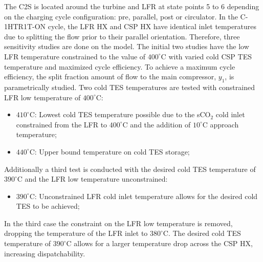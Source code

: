 \begin{paracol}{2}
\linenumbers
\switchcolumn

The C2S is located around the turbine and LFR at state points 5 to 6 depending on the charging cycle configuration: pre, parallel, post or circulator. In the C-1HTR1T-ON cycle, the LFR HX and CSP HX have identical inlet temperatures due to splitting the flow prior to their parallel orientation. Therefore, three sensitivity studies are done on the model. The initial two studies have the low LFR temperature constrained to the value of $400^{\circ}$C with varied cold CSP TES temperature and maximized cycle efficiency. To achieve a maximum cycle efficiency, the split fraction amount of flow to the main compressor, $y_{1}$, is parametrically studied.
Two cold TES temperatures are tested with constrained LFR low temperature of $400^{\circ}$C: 
\begin{itemize}
    \item	$410^{\circ}$C: Lowest cold TES temperature possible due to the sCO$_2$ cold inlet constrained from the LFR to $400^{\circ}$C and the addition of $10^{\circ}$C approach temperature;
    \item	$440^{\circ}$C: Upper bound temperature on cold TES storage;
\end{itemize}

Additionally a third test is conducted with the desired cold TES temperature of $390^{\circ}$C and the LFR low temperature unconstrained:

\begin{itemize}
    \item	$390^{\circ}$C: Unconstrained LFR cold inlet temperature allows for the desired cold TES to be achieved;
\end{itemize}

In the third case the constraint on the LFR low temperature is removed, dropping the temperature of the LFR inlet to $380^{\circ}$C. The desired cold TES temperature of $390^{\circ}$C allows for a larger temperature drop across the CSP HX, increasing dispatchability.

\end{paracol}

